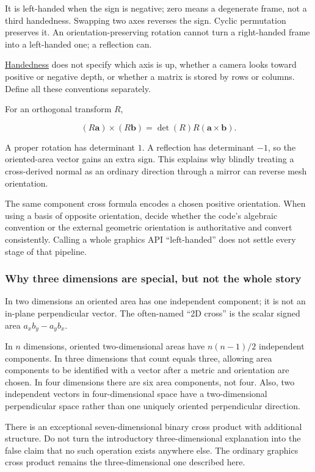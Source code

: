 It is left-handed when the sign is negative; zero means a degenerate frame, not a third handedness. Swapping two axes reverses the sign. Cyclic permutation preserves it. An orientation-preserving rotation cannot turn a right-handed frame into a left-handed one; a reflection can.

\hyperref[01-foundations-i-ch017-oriented-area-tells-us-which-side-of-the-panel-is-front]{Handedness} does not specify which axis is up, whether a camera looks toward positive or negative depth, or whether a matrix is stored by rows or columns. Define all these conventions separately.

For an orthogonal transform \(R\),

\[
(R\mathbf a)\times(R\mathbf b)
=\det(R)R(\mathbf a\times\mathbf b).
\]

A proper rotation has determinant \(1\). A reflection has determinant \(-1\), so the oriented-area vector gains an extra sign. This explains why blindly treating a cross-derived normal as an ordinary direction through a mirror can reverse mesh orientation.

The same component cross formula encodes a chosen positive orientation. When using a basis of opposite orientation, decide whether the code's algebraic convention or the external geometric orientation is authoritative and convert consistently. Calling a whole graphics API ``left-handed'' does not settle every stage of that pipeline.

\subsubsection{Why three dimensions are special, but not the whole story}\label{01-foundations-i-ch017-why-three-dimensions-are-special-but-not-the-whole-story}

In two dimensions an oriented area has one independent component; it is not an in-plane perpendicular vector. The often-named ``2D cross'' is the scalar signed area \(a_xb_y-a_yb_x\).

In \(n\) dimensions, oriented two-dimensional areas have \(n(n-1)/2\) independent components. In three dimensions that count equals three, allowing area components to be identified with a vector after a metric and orientation are chosen. In four dimensions there are six area components, not four. Also, two independent vectors in four-dimensional space have a two-dimensional perpendicular space rather than one uniquely oriented perpendicular direction.

There is an exceptional seven-dimensional binary cross product with additional structure. Do not turn the introductory three-dimensional explanation into the false claim that no such operation exists anywhere else. The ordinary graphics cross product remains the three-dimensional one described here.

